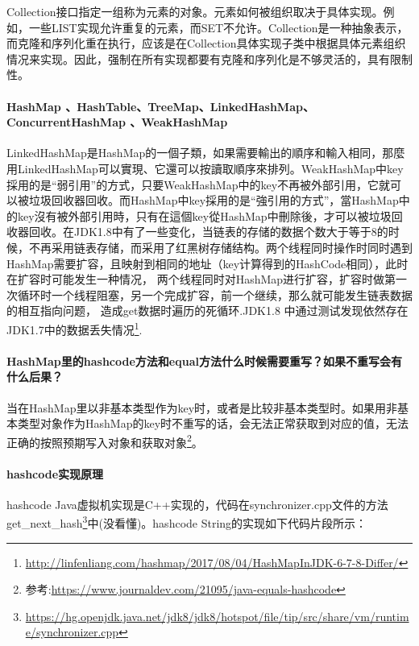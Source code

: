\documentclass[../../../interview-questions.tex]{subfiles}
\begin{document}
Collection接口指定一组称为元素的对象。元素如何被组织取决于具体实现。例如，一些LIST实现允许重复的元素，而SET不允许。Collection是一种抽象表示，而克隆和序列化重在执行，应该是在Collection具体实现子类中根据具体元素组织情况来实现。因此，强制在所有实现都要有克隆和序列化是不够灵活的，具有限制性。


\paragraph{HashMap 、HashTable、TreeMap、LinkedHashMap、ConcurrentHashMap 、WeakHashMap}

LinkedHashMap是HashMap的一個子類，如果需要輸出的順序和輸入相同，那麼用LinkedHashMap可以實現、它還可以按讀取順序來排列。WeakHashMap中key採用的是“弱引用”的方式，只要WeakHashMap中的key不再被外部引用，它就可以被垃圾回收器回收。而HashMap中key採用的是“強引用的方式”，當HashMap中的key沒有被外部引用時，只有在這個key從HashMap中刪除後，才可以被垃圾回收器回收。在JDK1.8中有了一些变化，当链表的存储的数据个数大于等于8的时候，不再采用链表存储，而采用了红黑树存储结构。两个线程同时操作时同时遇到HashMap需要扩容，且映射到相同的地址（key计算得到的HashCode相同），此时在扩容时可能发生一种情况， 两个线程同时对HashMap进行扩容，扩容时做第一次循环时一个线程阻塞，另一个完成扩容，前一个继续，那么就可能发生链表数据的相互指向问题， 造成get数据时遍历的死循环.JDK1.8 中通过测试发现依然存在JDK1.7中的数据丢失情况\footnote{\url{http://linfenliang.com/hashmap/2017/08/04/HashMapInJDK-6-7-8-Differ/}}.





\paragraph{HashMap里的hashcode方法和equal方法什么时候需要重写？如果不重写会有什么后果？}

当在HashMap里以非基本类型作为key时，或者是比较非基本类型时。如果用非基本类型对象作为HashMap的key时不重写的话，会无法正常获取到对应的值，无法正确的按照预期写入对象和获取对象\footnote{参考:\url{https://www.journaldev.com/21095/java-equals-hashcode}}。

\paragraph{hashcode实现原理}


hashcode Java虚拟机实现是C++实现的，代码在synchronizer.cpp文件的方法get\_next\_hash\footnote{\url{https://hg.openjdk.java.net/jdk8/jdk8/hotspot/file/tip/src/share/vm/runtime/synchronizer.cpp}}中(没看懂)。hashcode String的实现如下代码片段所示：
\end{document}

